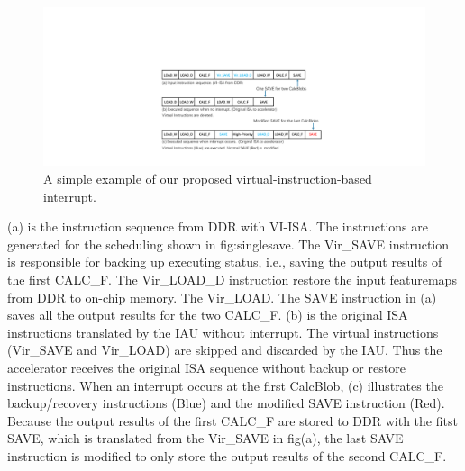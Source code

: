 \begin{figure}[t]
	\centering
	\includegraphics[width=0.9\linewidth]{fig/interexample.pdf}
	\caption{ A simple example of our proposed virtual-instruction-based interrupt. }
	\label{fig:interexample}
\end{figure}

(a) is the instruction sequence from DDR with VI-ISA. The instructions are generated for the scheduling shown in {fig:singlesave}. The Vir\_SAVE instruction is responsible for backing up executing status, i.e., saving the output results of the first CALC\_F. The Vir\_LOAD\_D instruction restore the input featuremaps from DDR to on-chip memory. The Vir\_LOAD. The SAVE instruction in (a) saves all the output results for the two CALC\_F.
(b) is the original ISA instructions translated by the IAU without interrupt. The virtual instructions (Vir\_SAVE and Vir\_LOAD) are skipped and discarded by the IAU. Thus the accelerator receives the original ISA sequence without backup or restore instructions.
When an interrupt occurs at the first CalcBlob, (c) illustrates the backup/recovery instructions (Blue) and the modified SAVE instruction (Red). Because the output results of the first CALC\_F are stored to DDR with the fitst SAVE, which is translated from the Vir\_SAVE in fig(a), the last SAVE instruction is modified to only store the output results of the second CALC\_F.